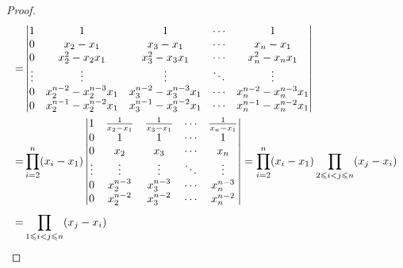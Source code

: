 \begin{proof}
\begin{align*}
		=&
		\begin{vmatrix}
			1 & 1 & 1 & \cdots & 1 \\
			0 & x_2-x_1 & x_3-x_1 & \cdots & x_n-x_1 \\
			0 & x_2^2-x_2x_1 & x_3^2-x_3x_1 & \cdots & x_n^2-x_nx_1 \\
			\vdots & \vdots & \vdots & \ddots & \vdots \\
			0 & x_2^{n-2}-x_2^{n-3}x_1 & x_3^{n-2}-x_3^{n-3}x_1 & \cdots & x_n^{n-2}-x_n^{n-3}x_1 \\
			0 & x_2^{n-1}-x_2^{n-2}x_1 & x_3^{n-1}-x_3^{n-2}x_1 & \cdots & x_n^{n-1}-x_n^{n-2}x_1
		\end{vmatrix} \\
		=&\prod_{i=2}^{n}(x_i-x_1)
		\begin{vmatrix}
			1 & \frac{1}{x_2-x_1} & \frac{1}{x_3-x_1} & \cdots & \frac{1}{x_n-x_1} \\
			0 & 1 & 1 & \cdots & 1 \\
			0 & x_2& x_3 & \cdots & x_n \\
			\vdots & \vdots & \vdots & \ddots & \vdots \\
			0 & x_2^{n-3} & x_3^{n-3}& \cdots & x_n^{n-3}\\
			0 & x_2^{n-2} & x_3^{n-2} & \cdots & x_n^{n-2}
		\end{vmatrix} 
		=\prod_{i=2}^{n}(x_i-x_1)\prod_{2\leqslant i<j\leqslant n}(x_j-x_i) \\
		=&\prod_{1\leqslant i<j\leqslant n}^{}(x_j-x_i)\qedhere
	\end{align*}
\end{proof}


